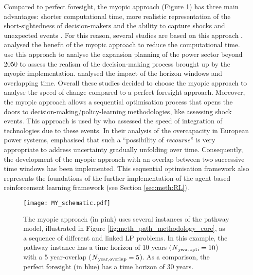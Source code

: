 Compared to perfect foresight, the myopic approach (Figure \ref{fig:my_schematic}) has three main advantages: shorter computational time, more realistic representation of the short-sightedness of decision-makers and the ability to capture shocks and unexpected events \cite{mccollum2020energy}. For this reason, several studies are based on this approach \citep{babrowski2014reducing,poncelet2016myopic,nerini2017myopic,heuberger2018impact}. \citet{babrowski2014reducing} analysed the benefit of the myopic approach to reduce the computational time. \citet{poncelet2016myopic} use this approach to analyse the expansion planning of the power sector beyond 2050 to assess the realism of the decision-making process brought up by the myopic implementation. \citet{nerini2017myopic} analysed the impact of the horizon windows and overlapping time.  Overall these studies decided to choose the myopic approach to analyse the speed of change compared to a perfect foresight approach.
Moreover, the myopic approach allows a sequential optimisation process that opens the doors to decision-making/policy-learning methodologies, like assessing shock events. This approach is used by \citet{heuberger2018impact} who assessed the speed of integration of technologies due to these events. 
In their analysis of the overcapacity in European power systems, \citet{moret2020overcapacity} emphasised that such a ``possibility of \textit{recourse}'' is very appropriate to address uncertainty gradually unfolding over time. Consequently, the development of the myopic approach with an overlap between two successive time windows has been implemented. This sequential optimisation framework also represents the foundations of the further implementation of the agent-based reinforcement learning framework (see Section \ref{sec:meth:RL}).

\begin{figure}[htbp!]
\centering
\texttt{[image: MY\_schematic.pdf]}
\caption{The myopic approach (in pink) uses several instances of the pathway model, illustrated in Figure \ref{fig:meth_path_methodology_core}, as a sequence of different and linked \gls{LP} problems. In this example, the pathway instance has a time horizon of 10 years ($N\textsubscript{year,opti}=10$) with a 5 year-overlap ($N\textsubscript{year,overlap}=5$). As a comparison, the perfect foresight (in blue) has a time horizon of 30 years.}
\label{fig:my_schematic}
\end{figure}

